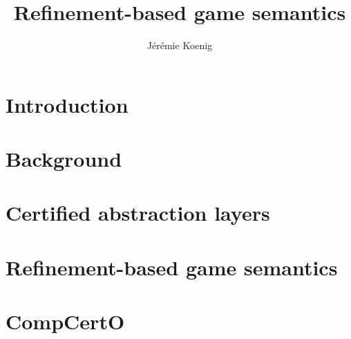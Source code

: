 \documentclass[draft]{report}
\title{Refinement-based game semantics}
\author{J\'er\'emie Koenig}
\begin{document}
\begin{abstract}

\end{abstract}

\titlepage

\tableofcontents

\chapter{Introduction}

\chapter{Background}

\chapter{Certified abstraction layers}

\chapter{Refinement-based game semantics}



\chapter{CompCertO}

%

\thebibliography
\end{document}
